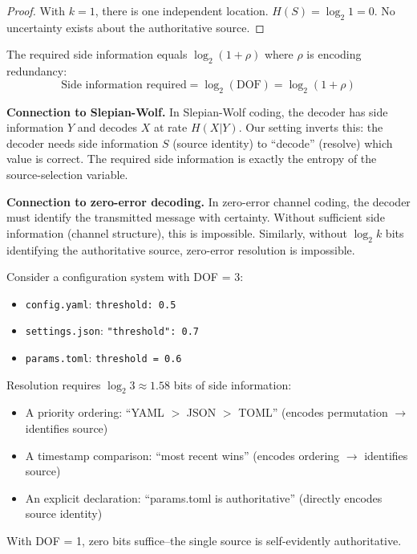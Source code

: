 \begin{proof}
With $k = 1$, there is one independent location. $H(S) = \log_2 1 = 0$. No uncertainty exists about the authoritative source.
\end{proof}

\begin{corollary}\label{cor:side-info-redundancy}
The required side information equals $\log_2(1 + \rho)$ where $\rho$ is encoding redundancy:
\[
\text{Side information required} = \log_2(\text{DOF}) = \log_2(1 + \rho)
\]
\end{corollary}

\textbf{Connection to Slepian-Wolf.} In Slepian-Wolf coding, the decoder has side information $Y$ and decodes $X$ at rate $H(X|Y)$. Our setting inverts this: the decoder needs side information $S$ (source identity) to ``decode'' (resolve) which value is correct. The required side information is exactly the entropy of the source-selection variable.

\textbf{Connection to zero-error decoding.} In zero-error channel coding, the decoder must identify the transmitted message with certainty. Without sufficient side information (channel structure), this is impossible. Similarly, without $\log_2 k$ bits identifying the authoritative source, zero-error resolution is impossible.

\begin{example}\label{ex:side-info-practice}
Consider a configuration system with DOF = 3:
\begin{itemize}
\tightlist
\item \texttt{config.yaml}: \texttt{threshold: 0.5}
\item \texttt{settings.json}: \texttt{"threshold": 0.7}
\item \texttt{params.toml}: \texttt{threshold = 0.6}
\end{itemize}

Resolution requires $\log_2 3 \approx 1.58$ bits of side information:
\begin{itemize}
\tightlist
\item A priority ordering: ``YAML $>$ JSON $>$ TOML'' (encodes permutation $\to$ identifies source)
\item A timestamp comparison: ``most recent wins'' (encodes ordering $\to$ identifies source)
\item An explicit declaration: ``params.toml is authoritative'' (directly encodes source identity)
\end{itemize}

With DOF = 1, zero bits suffice--the single source is self-evidently authoritative.
\end{example}

